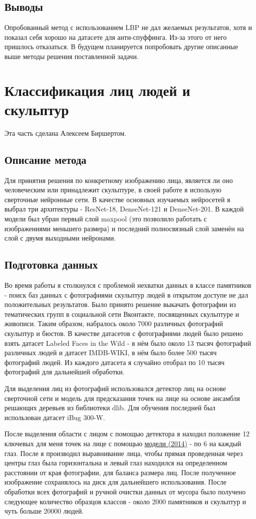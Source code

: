 \documentclass[a4paper,14pt]{extarticle}
\newcommand{\bibref}[3]{\hyperlink{#1}{#2 (#3)}} %
\begin{document}
    \subsection{Выводы}
    Опробованный метод с использованием LBP не дал желаемых результатов, хотя и показал себя хорошо на датасете для анти-спуффинга. Из-за этого от него пришлось отказаться. В будущем планируется попробовать другие описанные выше методы решения поставленной задачи.
    \newpage

    \section{Классификация лиц людей и скульптур}
    Эта часть сделана Алексеем Биршертом.
    \subsection{Описание метода}
    Для принятия решения по конкретному изображению лица, является ли оно человеческим или принадлежит скульптуре, в своей работе я использую сверточные нейронные сети. В качестве основных изучаемых нейросетей я выбрал три архитектуры - ResNet-18, DenseNet-121 и DenseNet-201. В каждой модели был убран первый слой maxpool (это позволило работать с изображениями меньшего размера) и последний полносвязный слой заменён на слой с двумя выходными нейронами.

    \subsection{Подготовка данных}
    \par Во время работы я столкнулся с проблемой нехватки данных в классе памятников - поиск баз данных с фотографиями скульптур людей в открытом доступе не дал положительных результатов. Было принято решение выкачать фотографии из тематических групп в социальной сети Вконтакте, посвященных скульптуре и живописи. Таким образом, набралось около 7000 различных фотографий скульптур и бюстов. В качестве датасетов с фотографиями людей было решено взять датасет Labeled Faces in the Wild - в нём было около 13 тысяч фотографий различных людей и датасет IMDB-WIKI, в нём было более 500 тысяч фотографий людей. Из каждого датасета я случайно отобрал по 10 тысяч фотографий для дальнейшей обработки.
    \par Для выделения лиц из фотографий использовался детектор лиц на основе сверточной сети и модель для предсказания точек на лице на основе ансамбля решающих деревьев из библиотеки dlib. Для обучения последней был использован датасет iBug 300-W.
    \par После выделения области с лицом с помощью детектора я находил положение 12 ключевых для меня точек на лице с помощью \bibref{align}{модели}{2014} - по 6 на каждый глаз. После я производил выравнивание лица, чтобы прямая проведенная через центры глаз была горизонтальна и левый глаз находился на определенном расстоянии от края фотографии, для баланса размера лиц. После полученное изображение сохранялось на диск для дальнейшего использования. После обработки всех фотографий и ручной очистки данных от мусора было получено следующее количество образцов классов - около 2000 памятников и скульптур и чуть больше 20000 людей.
\end{document}
